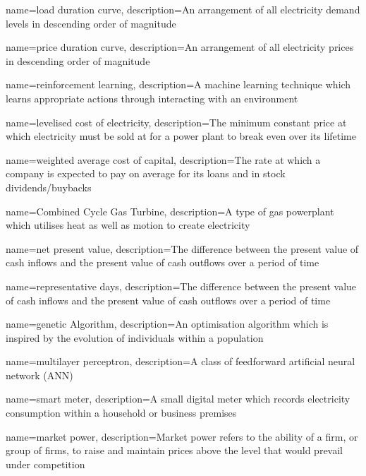 {
	name=load duration curve,
	description={An arrangement of all electricity demand levels in descending order of magnitude}
}




{
	name=price duration curve,
	description={An arrangement of all electricity prices in descending order of magnitude}
}


{
	name=reinforcement learning,
	description={A machine learning technique which learns appropriate actions through interacting with an environment}
}



{
	name=levelised cost of electricity,
	description={The minimum constant price at which electricity must be sold at for a power plant to break even over its lifetime}
}



{
	name=weighted average cost of capital,
	description={The rate at which a company is expected to pay on average for its loans and in stock dividends/buybacks}
}


{
	name=Combined Cycle Gas Turbine,
	description={A type of gas powerplant which utilises heat as well as motion to create electricity}
}



{
	name=net present value,
	description={The difference between the present value of cash inflows and the present value of cash outflows over a period of time}
}


{
	name=representative days,
	description={The difference between the present value of cash inflows and the present value of cash outflows over a period of time}
}


{
	name=genetic Algorithm,
	description={An optimisation algorithm which is inspired by the evolution of individuals within a population}
}



{
	name=multilayer perceptron,
	description={A class of feedforward artificial neural network (ANN)}
}


{
	name=smart meter,
	description={A small digital meter which records electricity consumption within a household or business premises}
}

{
	name=market power,
	description={Market power refers to the ability of a firm, or group of firms, to raise and maintain prices above the level that would prevail under competition}
}






